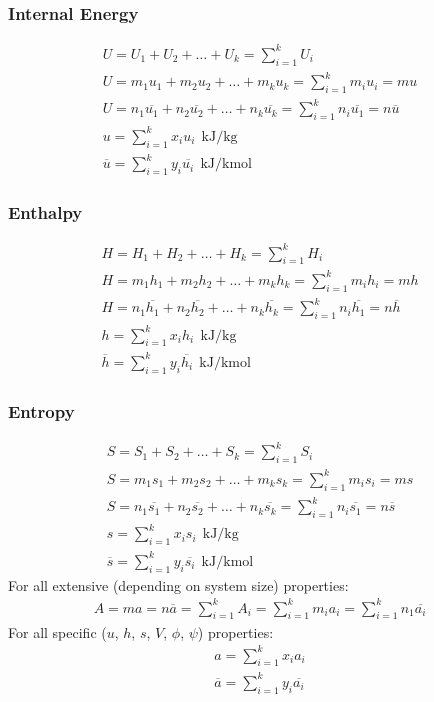 \documentclass[class=report, crop=false, 12pt,a4paper]{standalone}
\begin{document}
\subsubsection{Internal Energy}
\begin{gather}
  U = U_1 + U_2 + \dots + U_k = \sum_{i=1}^{k}U_i \\[5pt]
  U = m_1u_1 + m_2u_2 + \dots + m_ku_k = \sum_{i=1}^{k}m_iu_i = mu \\[5pt]
  U = n_1\overline{u_1} + n_2\overline{u_2} + \dots + n_k\overline{u_k} = \sum_{i=1}^{k} n_i\overline{u_1} = n\overline{u} \\[5pt]
  u = \sum_{i=1}^{k} x_i u_i \ \ \si{\kilo\joule\per\kilogram} \\[5pt]
  \overline{u} = \sum_{i=1}^{k} y_i \overline{u_i} \ \ \si{\kilo\joule\per\kilo\mole}
\end{gather}
\subsubsection{Enthalpy}
\begin{gather}
  H = H_1 + H_2 + \dots + H_k = \sum_{i=1}^{k}H_i \\[5pt]
  H = m_1h_1 + m_2h_2 + \dots + m_kh_k = \sum_{i=1}^{k}m_ih_i = mh \\[5pt]
  H = n_1\overline{h_1} + n_2\overline{h_2} + \dots + n_k\overline{h_k} = \sum_{i=1}^{k} n_i\overline{h_1} = n\overline{h} \\[5pt]
  h = \sum_{i=1}^{k} x_i h_i \ \ \si{\kilo\joule\per\kilogram} \\[5pt]
  \overline{h} = \sum_{i=1}^{k} y_i \overline{h_i} \ \ \si{\kilo\joule\per\kilo\mole}
\end{gather}
\subsubsection{Entropy}
\begin{gather}
  S = S_1 + S_2 + \dots + S_k = \sum_{i=1}^{k}S_i \\[5pt]
  S = m_1s_1 + m_2s_2 + \dots + m_ks_k = \sum_{i=1}^{k}m_is_i = ms \\[5pt]
  S = n_1\overline{s_1} + n_2\overline{s_2} + \dots + n_k\overline{s_k} = \sum_{i=1}^{k} n_i\overline{s_1} = n\overline{s} \\[5pt]
  s = \sum_{i=1}^{k} x_i s_i \ \ \si{\kilo\joule\per\kilogram} \\[5pt]
  \overline{s} = \sum_{i=1}^{k} y_i \overline{s_i} \ \ \si{\kilo\joule\per\kilo\mole}
\end{gather}
For all extensive (depending on system size) properties:
\begin{gather}
  A = ma = n\overline{a} = \sum_{i=1}^{k}A_i = \sum_{i=1}^{k}m_i a_i = \sum_{i=1}^{k}n_1\overline{a_i}
\end{gather}
For all specific ($u$, $h$, $s$, $V$, $\phi$, $\psi$) properties: 
\begin{gather}
  a = \sum_{i=1}^{k}x_i a_i \\[5pt]
  \overline{a} = \sum_{i=1}^{k}y_i \overline{a_i}
\end{gather}
\end{document}
